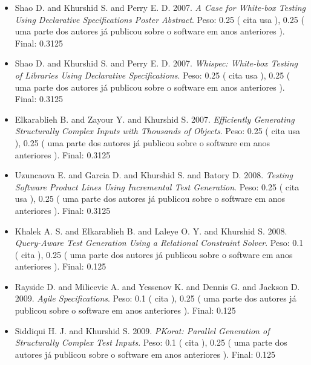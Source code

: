 \begin{itemize}
\item Shao D. and Khurshid S. and Perry E. D.
      2007.
        \textit{ A Case for White-box Testing Using Declarative Specifications Poster Abstract}.
      Peso:
      0.25 (
          cita
          usa
      ),
      0.25 (
uma parte dos autores já publicou sobre o software em anos anteriores
      ).
      Final:
      0.3125

\item Shao D. and Khurshid S. and Perry E. D.
      2007.
        \textit{ Whispec: White-box Testing of Libraries Using Declarative Specifications}.
      Peso:
      0.25 (
          cita
          usa
      ),
      0.25 (
uma parte dos autores já publicou sobre o software em anos anteriores
      ).
      Final:
      0.3125

\item Elkarablieh B. and Zayour Y. and Khurshid S.
      2007.
        \textit{ Efficiently Generating Structurally Complex Inputs with Thousands of Objects}.
      Peso:
      0.25 (
          cita
          usa
      ),
      0.25 (
uma parte dos autores já publicou sobre o software em anos anteriores
      ).
      Final:
      0.3125

\item Uzuncaova E. and Garcia D. and Khurshid S. and Batory D.
      2008.
        \textit{ Testing Software Product Lines Using Incremental Test Generation}.
      Peso:
      0.25 (
          cita
          usa
      ),
      0.25 (
uma parte dos autores já publicou sobre o software em anos anteriores
      ).
      Final:
      0.3125

\item Khalek A. S. and Elkarablieh B. and Laleye O. Y. and Khurshid S.
      2008.
        \textit{ Query-Aware Test Generation Using a Relational Constraint Solver}.
      Peso:
      0.1 (
          cita
      ),
      0.25 (
uma parte dos autores já publicou sobre o software em anos anteriores
      ).
      Final:
      0.125

\item Rayside D. and Milicevic A. and Yessenov K. and Dennis G. and Jackson D.
      2009.
        \textit{ Agile Specifications}.
      Peso:
      0.1 (
          cita
      ),
      0.25 (
uma parte dos autores já publicou sobre o software em anos anteriores
      ).
      Final:
      0.125

\item Siddiqui H. J. and Khurshid S.
      2009.
        \textit{ PKorat: Parallel Generation of Structurally Complex Test Inputs}.
      Peso:
      0.1 (
          cita
      ),
      0.25 (
uma parte dos autores já publicou sobre o software em anos anteriores
      ).
      Final:
      0.125


\end{itemize}
